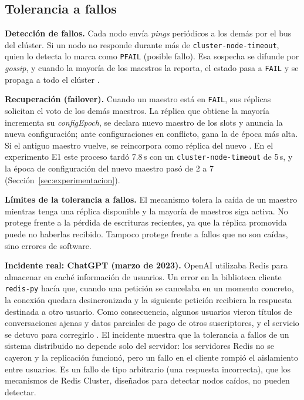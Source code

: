 \documentclass[11pt,a4paper]{article}
\begin{document}
\subsection{Tolerancia a fallos}

\textbf{Detección de fallos.} Cada nodo envía \emph{pings} periódicos a los
demás por el bus del clúster. Si un nodo no responde durante más de
\texttt{cluster-node-timeout}, quien lo detecta lo marca como \texttt{PFAIL}
(posible fallo). Esa sospecha se difunde por \emph{gossip}, y cuando la
mayoría de los maestros la reporta, el estado pasa a \texttt{FAIL} y se
propaga a todo el clúster \cite{redis2026clusterspec}.

\textbf{Recuperación (failover).} Cuando un maestro está en \texttt{FAIL},
sus réplicas solicitan el voto de los demás maestros. La réplica que obtiene
la mayoría incrementa su \emph{configEpoch}, se declara nuevo maestro de los
slots y anuncia la nueva configuración; ante configuraciones en conflicto,
gana la de época más alta. Si el antiguo maestro vuelve, se reincorpora como
réplica del nuevo \cite{redis2026clusterspec}. En el experimento E1 este
proceso tardó 7.8\,s con un \texttt{cluster-node-timeout} de 5\,s, y la época
de configuración del nuevo maestro pasó de 2 a 7
(Sección~\ref{sec:experimentacion}).

\textbf{Límites de la tolerancia a fallos.} El mecanismo tolera la caída de
un maestro mientras tenga una réplica disponible y la mayoría de maestros siga
activa. No protege frente a la pérdida de escrituras recientes, ya que la
réplica promovida puede no haberlas recibido. Tampoco protege frente a fallos
que no son caídas, sino errores de software.

\textbf{Incidente real: ChatGPT (marzo de 2023).} OpenAI utilizaba Redis para
almacenar en caché información de usuarios. Un error en la biblioteca cliente
\texttt{redis-py} hacía que, cuando una petición se cancelaba en un momento
concreto, la conexión quedara desincronizada y la siguiente petición recibiera
la respuesta destinada a otro usuario. Como consecuencia, algunos usuarios
vieron títulos de conversaciones ajenas y datos parciales de pago de otros
suscriptores, y el servicio se detuvo para corregirlo \cite{openai2023outage}.
El incidente muestra que la tolerancia a fallos de un sistema distribuido no
depende solo del servidor: los servidores Redis no se cayeron y la
replicación funcionó, pero un fallo en el cliente rompió el aislamiento entre
usuarios. Es un fallo de tipo arbitrario (una respuesta incorrecta), que los
mecanismos de Redis Cluster, diseñados para detectar nodos caídos, no pueden
detectar.
\end{document}
